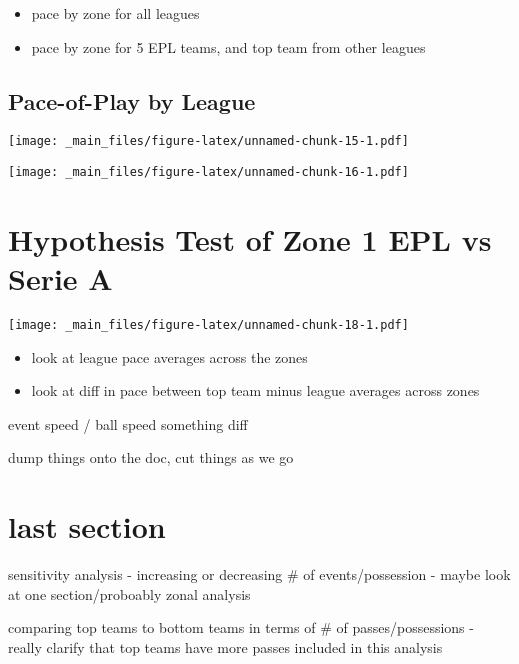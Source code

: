 \documentclass[]{book}
\providecommand{\tightlist}{%
  \setlength{\itemsep}{0pt}\setlength{\parskip}{0pt}}
\begin{document}
\begin{itemize}
\tightlist
\item
  pace by zone for all leagues
\item
  pace by zone for 5 EPL teams, and top team from other leagues
\end{itemize}

\hypertarget{pace-of-play-by-league}{%
\section{Pace-of-Play by League}\label{pace-of-play-by-league}}

\texttt{[image: \_main\_files/figure-latex/unnamed-chunk-15-1.pdf]}

\texttt{[image: \_main\_files/figure-latex/unnamed-chunk-16-1.pdf]}

\hypertarget{hypothesis-test-of-zone-1-epl-vs-serie-a}{%
\chapter{Hypothesis Test of Zone 1 EPL vs Serie A}\label{hypothesis-test-of-zone-1-epl-vs-serie-a}}

\texttt{[image: \_main\_files/figure-latex/unnamed-chunk-18-1.pdf]}

\begin{itemize}
\tightlist
\item
  look at league pace averages across the zones
\item
  look at diff in pace between top team minus league averages across zones
\end{itemize}

event speed / ball speed something diff

dump things onto the doc, cut things as we go

\hypertarget{last-section}{%
\chapter{last section}\label{last-section}}

sensitivity analysis - increasing or decreasing \# of events/possession
- maybe look at one section/proboably zonal analysis

comparing top teams to bottom teams in terms of \# of passes/possessions
- really clarify that top teams have more passes included in this analysis
\end{document}

